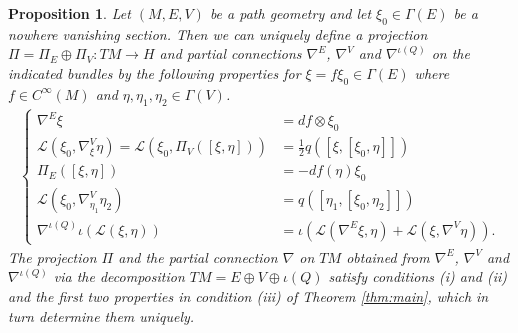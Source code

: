 \documentclass[11pt]{amsart}
\newtheorem{proposition}{Proposition}
\numberwithin{proposition}{section}
\numberwithin{equation}{section}
\begin{document}
\begin{proposition}\label{prop:homog1}
    Let $(M,E,V)$ be a path geometry and let $\xi_0\in\Gamma(E)$ be a nowhere vanishing section. Then we can uniquely define a projection $\Pi=\Pi_E\oplus\Pi_V:TM\to H$ and partial connections $\nabla^E$, $\nabla^V$ and $\nabla^{\iota(Q)}$ on the indicated bundles by the following properties for $\xi=f\xi_0\in \Gamma(E)$ where $f\in C^\infty(M)$ and $\eta,\eta_1,\eta_2\in\Gamma(V)$.
\begin{equation}\label{homog1-props}
\begin{aligned}
\begin{cases}
\nabla^E\xi&=df\otimes\xi_0\\
\mathcal L(\xi_0,\nabla^V_{\xi}\eta)=\mathcal L(\xi_0,\Pi_V([\xi,\eta]))&=\frac 1 2 q([\xi,[\xi_0,\eta]])\\
\Pi_E([\xi,\eta])&=-df(\eta)\xi_0\\
\mathcal L(\xi_0,\nabla^V_{\eta_1}\eta_2)&=q([\eta_1,[\xi_0,\eta_2]])\\
\nabla^{\iota(Q)}\iota(\mathcal L(\xi,\eta))&=\iota(\mathcal L(\nabla^E\xi,\eta)+\mathcal L(\xi,\nabla^V\eta)).
\end{cases}
\end{aligned}
\end{equation}
The projection $\Pi$ and the partial connection $\nabla$ on $TM$ obtained from $\nabla^E$, $\nabla^V$ and $\nabla^{\iota(Q)}$ via the decomposition $TM=E\oplus V\oplus\iota(Q)$  satisfy conditions (i) and (ii) and the first two properties in condition (iii) of Theorem \ref{thm:main}, which in turn determine them uniquely.  
\end{proposition}
\end{document}
